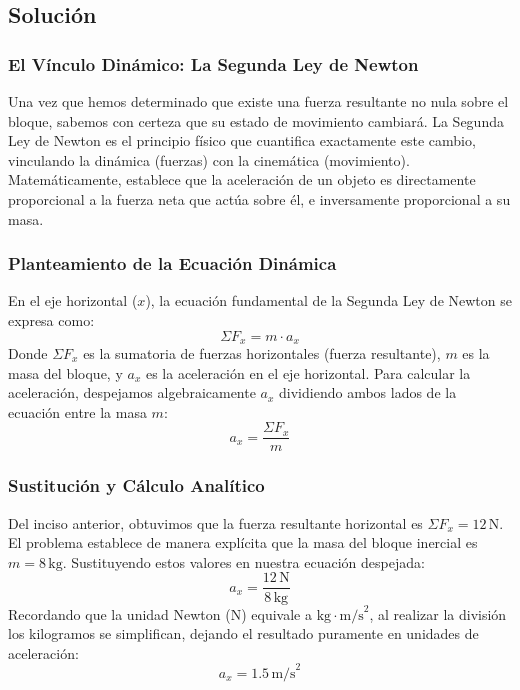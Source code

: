 \documentclass[12pt]{article}
\begin{document}
\subsection*{Solución}

\subsubsection*{El Vínculo Dinámico: La Segunda Ley de Newton}
Una vez que hemos determinado que existe una fuerza resultante no nula sobre el bloque, sabemos con certeza que su estado de movimiento cambiará. La Segunda Ley de Newton es el principio físico que cuantifica exactamente este cambio, vinculando la dinámica (fuerzas) con la cinemática (movimiento). Matemáticamente, establece que la aceleración de un objeto es directamente proporcional a la fuerza neta que actúa sobre él, e inversamente proporcional a su masa.

\subsubsection*{Planteamiento de la Ecuación Dinámica}
En el eje horizontal ($x$), la ecuación fundamental de la Segunda Ley de Newton se expresa como:
\begin{equation}
    \Sigma F_x = m \cdot a_x
\end{equation}
Donde $\Sigma F_x$ es la sumatoria de fuerzas horizontales (fuerza resultante), $m$ es la masa del bloque, y $a_x$ es la aceleración en el eje horizontal. 
Para calcular la aceleración, despejamos algebraicamente $a_x$ dividiendo ambos lados de la ecuación entre la masa $m$:
\begin{equation}
    a_x = \frac{\Sigma F_x}{m}
\end{equation}

\subsubsection*{Sustitución y Cálculo Analítico}
Del inciso anterior, obtuvimos que la fuerza resultante horizontal es $\Sigma F_x = 12 \, \text{N}$. El problema establece de manera explícita que la masa del bloque inercial es $m = 8 \, \text{kg}$. Sustituyendo estos valores en nuestra ecuación despejada:
\begin{equation}
    a_x = \frac{12 \, \text{N}}{8 \, \text{kg}}
\end{equation}
Recordando que la unidad Newton (N) equivale a $\text{kg} \cdot \text{m/s}^2$, al realizar la división los kilogramos se simplifican, dejando el resultado puramente en unidades de aceleración:
\begin{equation}
    a_x = 1.5 \, \text{m/s}^2
\end{equation}
\end{document}
